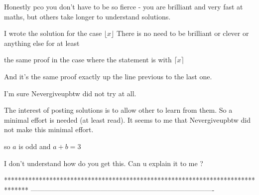 \begin{solution}
	\begin{tcolorbox}Honestly pco you don't have to be so fierce - you are brilliant and very fast at maths, but others take longer to understand solutions.\end{tcolorbox}
I wrote the solution for the case $\lfloor x\rfloor$
There is no need to be brilliant or clever or anything else for at least the same proof in the case where the statement is with $\lceil x\rceil$

And it's the same proof exactly up the line previous to the last one.

I'm sure Nevergiveupbtw did not try at all.

The interest of posting solutions is to allow other to learn from them. So a minimal effort is needed (at least read). It seems to me that Nevergiveupbtw  did not make this minimal effort.
\end{solution}



\begin{solution}
	\begin{tcolorbox}so $a$ is odd and $a+b=3$\end{tcolorbox}

I don't understand how do you get this. Can u explain it to me ?
\end{solution}



*******************************************************************************
-------------------------------------------------------------------------------

